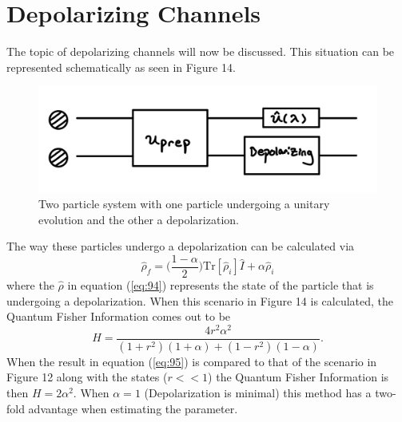 \documentclass[twocolumn]{article}
\begin{document}
\section*{Depolarizing Channels}
The topic of depolarizing channels will now be discussed. This situation can be represented schematically as seen in Figure 14.
\begin{figure}[h]
\begin{center}
\includegraphics[width=0.66\linewidth]{TP-Depolarizing.PNG}
\caption{Two particle system with one particle undergoing a unitary evolution and the other a depolarization.}
\end{center}
\end{figure}
\newline
The way these particles undergo a depolarization can be calculated via
\begin{equation}\label{eq:94}
\hat{\rho}_f=\Big(\frac{1-\alpha}{2}\Big)\text{Tr}[\hat{\rho}_i]\hat{I}+\alpha\hat{\rho}_i
\end{equation}
where the $\hat{\rho}$ in equation (\ref{eq:94}) represents the state of the particle that is undergoing a depolarization. When this scenario in Figure 14 is calculated, the Quantum Fisher Information comes out to be
\begin{equation}\label{eq:95}
H=\frac{4r^2\alpha^2}{(1+r^2)(1+\alpha)+(1-r^2)(1-\alpha)}.
\end{equation}
When the result in equation (\ref{eq:95}) is compared to that of the scenario in Figure 12 along with the states ($r<<1$) the Quantum Fisher Information is then $H=2\alpha^2$. When $\alpha=1$ (Depolarization is minimal) this method has a two-fold advantage when estimating the parameter.
\end{document}
